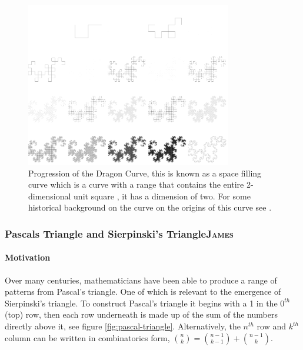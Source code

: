 \documentclass[a4paper,11pt,twoside]{article}
\begin{document}
\begin{figure}[htbp]
\centering
\includegraphics[width=9cm]{../Problems/Chaos/Spirals/dragon.png}
\caption{\label{dragon-turtle}Progression of the Dragon Curve, this is known as a space filling curve \cite[p. 350]{peitgenChaosFractalsNew2004} which is a curve with a range that contains the entire 2-dimensional unit square \cite{ventrellaSpaceFillingCurvesAre2014}, it has a dimension of two. For some historical background on the curve on the origins of this curve see \cite{tabachnikovDragonCurvesRevisited2014}.}
\end{figure}





 \newpage 
\subsubsection{Pascals Triangle and Sierpinski's Triangle\hfill{}\textsc{James}}
\label{pascal-sierpinski}
\paragraph{Motivation}
\label{sec:org3238ff8}
Over many centuries, mathematicians have been able to produce a range of patterns from Pascal's triangle. One of which is relevant to the emergence of Sierpinski's triangle. To construct Pascal's triangle it begins with a 1 in the \(0^{th}\) (top) row, then each row underneath is made up of the sum of the numbers directly above it, see figure \ref{fig:pascal-triangle}. Alternatively, the \(n^{th}\) row and \(k^{th}\) column can be written in combinatorics form, \(\binom{n}{k} = \binom{n-1}{k-1} + \binom{n-1}{k}\).
\end{document}
